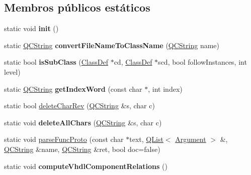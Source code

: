 \subsection*{Membros públicos estáticos}
\begin{DoxyCompactItemize}
\item 
\hypertarget{class_vhdl_doc_gen_a02fd73d861ef2e4aabb38c0c9ff82947}{static void {\bfseries init} ()}\label{class_vhdl_doc_gen_a02fd73d861ef2e4aabb38c0c9ff82947}

\item 
\hypertarget{class_vhdl_doc_gen_ad0bb205f41cf85881d47e27b9981bcc4}{static \hyperlink{class_q_c_string}{Q\-C\-String} {\bfseries convert\-File\-Name\-To\-Class\-Name} (\hyperlink{class_q_c_string}{Q\-C\-String} name)}\label{class_vhdl_doc_gen_ad0bb205f41cf85881d47e27b9981bcc4}

\item 
\hypertarget{class_vhdl_doc_gen_a5d71f54a335c7df5f749df7382fa231d}{static bool {\bfseries is\-Sub\-Class} (\hyperlink{class_class_def}{Class\-Def} $\ast$cd, \hyperlink{class_class_def}{Class\-Def} $\ast$scd, bool follow\-Instances, int level)}\label{class_vhdl_doc_gen_a5d71f54a335c7df5f749df7382fa231d}

\item 
\hypertarget{class_vhdl_doc_gen_a0aa621380b7c692d483cea9072c4c6d0}{static \hyperlink{class_q_c_string}{Q\-C\-String} {\bfseries get\-Index\-Word} (const char $\ast$, int index)}\label{class_vhdl_doc_gen_a0aa621380b7c692d483cea9072c4c6d0}

\item 
static bool \hyperlink{class_vhdl_doc_gen_ab1f39ec7d61cf22470c7869700c136f0}{delete\-Char\-Rev} (\hyperlink{class_q_c_string}{Q\-C\-String} \&s, char c)
\item 
\hypertarget{class_vhdl_doc_gen_a3bd70d10495c925c8a91595ef49e7873}{static void {\bfseries delete\-All\-Chars} (\hyperlink{class_q_c_string}{Q\-C\-String} \&s, char c)}\label{class_vhdl_doc_gen_a3bd70d10495c925c8a91595ef49e7873}

\item 
static void \hyperlink{class_vhdl_doc_gen_aa61248872e13be47a3055ac7ab4f27b4}{parse\-Func\-Proto} (const char $\ast$text, \hyperlink{class_q_list}{Q\-List}$<$ \hyperlink{struct_argument}{Argument} $>$ \&, \hyperlink{class_q_c_string}{Q\-C\-String} \&name, \hyperlink{class_q_c_string}{Q\-C\-String} \&ret, bool doc=false)
\item 
\hypertarget{class_vhdl_doc_gen_a6482d30123e6555d52e46eae423b6c5e}{static void {\bfseries compute\-Vhdl\-Component\-Relations} ()}\label{class_vhdl_doc_gen_a6482d30123e6555d52e46eae423b6c5e}


\end{DoxyCompactItemize}
